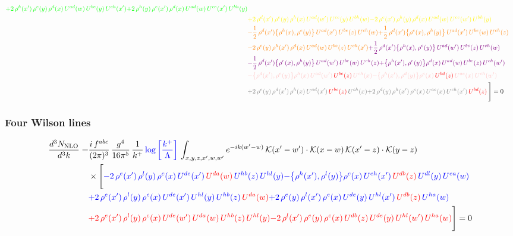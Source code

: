 \documentclass[9pt]{article}
\numberwithin{equation}{section}
\begin{document}
\begin{align}
{\color{green}+2\,\rho^{h}(x')\,\rho^{e}(y)\,\rho^{d}(x)\,U^{ad}(w)\,U^{be}(y)\,U^{ch}(x')}{\color{green}+2\,\rho^{h}(y)\,\rho^{e}(x')\,\rho^{d}(x)\,U^{ad}(w)\,U^{ce}(x')\,U^{bh}(y)}\notag \\ & {\color{yellow}+2\,\rho^{d}(x')\,\rho^{e}(y)\,\rho^{h}(x)\,U^{ad}(w')\,U^{ce}(y)\,U^{bh}(w)}{\color{yellow}-2\,\rho^{e}(x')\,\rho^{h}(y)\,\rho^{d}(x)\,U^{ad}(w)\,U^{ce}(w')\,U^{bh}(y)}\notag \\ & {\color{orange}-\frac{1}{2}\,\rho^{d}(x')\big\{\rho^{h}(x),\rho^{e}(y)\big\}\,U^{ad}(x')\,U^{be}(z)\,U^{ch}(w)}{\color{orange}+\frac{1}{2}\,\rho^{d}(x')\big\{\rho^{e}(x),\rho^{h}(y)\big\}\,U^{ad}(x')\,U^{be}(w)\,U^{ch}(z)}\notag \\
&{\color{orange}-2\,\rho^{e}(y)\,\rho^{h}(x')\,\rho^{d}(x)\,U^{ad}(w)\,U^{be}(z)\,U^{ch}(x')}{\color{violet}+\frac{1}{2}\,\rho^{d}(x')\big\{\rho^{h}(x),\rho^{e}(y)\big\}\,U^{ad}(w')\,U^{be}(z)\,U^{ch}(w)}\notag \\ & {\color{violet}-\frac{1}{2}\,\rho^{d}(x')\big\{\rho^{e}(x),\rho^{h}(y)\big\}\,U^{ad}(w')\,U^{be}(w)\,U^{ch}(z)}{\color{violet}+\big\{\rho^{h}(x'),\rho^{e}(y)\big\}\rho^{d}(x)\,U^{ad}(w)\,U^{be}(z)\,U^{ch}(w')}\notag \\ &{\color{pink}-\big\{\rho^{d}(x'),\rho^{e}(y)\big\}\rho^{h}(x)\,U^{ad}(w')\,{\color{red}U^{be}(z)}\,U^{ch}(x)}{\color{pink}-\big\{\rho^{h}(x'),\rho^{d}(y)\big\}\rho^{e}(x)\,{\color{red}U^{bd}(z)}\,U^{ae}(x)\,U^{ch}(w')}\notag \\ &{\color{gray}+2\,\rho^{e}(y)\,\rho^{d}(x')\, \rho^{h}(x)\, U^{ad}(x')\,{\color{red}U^{be}(z)}\,U^{ch}(x)}{\color{gray}+2\,\rho^{d}(y)\,\rho^{h}(x')\,\rho^{e}(x)\,U^{ae}(x)\,U^{ch}(x')\,{\color{red}U^{bd}(z)}}\,\Bigg] = 0
\end{align}    
\subsubsection{Four Wilson lines}
\begin{align}
    \frac{d^{3}N_{\rm NLO}}{d^{3}k}= & \frac{i\,f^{abc}}{(2\pi)^{3}}\,\frac{g^{4}}{16\pi^{5}}\,\frac{1}{k^{+}}\,{\color{blue}\log{\left[\frac{k^{+}}{\Lambda}\right]}}\,\int_{x,y,z,x',w,w'}e^{-ik(w'-w)}\,\mathcal{K}(x'-w')\cdot\mathcal{K}(x-w)\,\mathcal{K}(x'-z)\cdot\mathcal{K}(y-z)\notag \\ & \times\Bigg[{\color{blue}-2\,\rho^{e}(x')\,\rho^{l}(y)\,\rho^{c}(x)\, U^{de}(x')\,{\color{red}U^{da}(w)}\,U^{hb}(z)\,U^{hl}(y)}{\color{blue}-\big\{\rho^{h}(x'),\rho^{l}(y)\big\}\rho^{c}(x)\,U^{eh}(x')\,{\color{red}U^{db}(z)}\,U^{dl}(y)\,U^{ea}(w)}\notag \\ & {\color{blue}+2\,\rho^{e}(x')\,\rho^{l}(y)\, \rho^{c}(x)\, U^{de}(x')\,U^{hl}(y)\,U^{hb}(z)\,{\color{red}U^{da}(w)}} {\color{blue}+2\,\rho^{e}(y)\,\rho^{l}(x')\, \rho^{c}(x)\, U^{de}(y)\,U^{hl}(x')\,{\color{red}U^{db}(z)}\,U^{ha}(w)}\notag \\ & {\color{red}+2\,\rho^{e}(x')\,\rho^{l}(y)\,\rho^{c}(x)\, U^{de}(w')\,{\color{red}U^{da}(w)}\,U^{hb}(z)\,U^{hl}(y)}{\color{red}-2\,\rho^{l}(x')\,\rho^{e}(y)\, \rho^{c}(x)\, {\color{red}U^{db}(z)}\,U^{de}(y)\,U^{hl}(w')\,{\color{red}U^{ha}(w)}}\Bigg] = 0
\end{align}    
\end{document}
